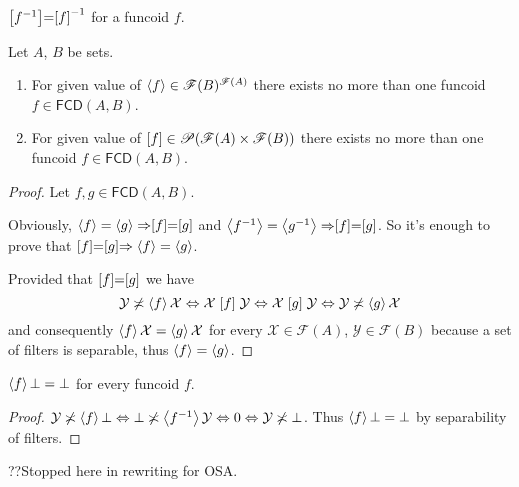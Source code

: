 \begin{obvious}
$\mathrel{\left[f^{-1}\right]}=\mathrel{\left[f\right]}^{-1}$ for a funcoid $f$.\end{obvious}
\begin{thm}
Let $A$, $B$ be sets.
\begin{enumerate}
\item For given value of $\left\langle f\right\rangle\in\mathscr{F}(B)^{\mathscr{F}(A)}$
there exists no more than one funcoid $f\in\mathsf{FCD}(A,B)$.
\item For given value of $\mathord{\mathrel{\left[f\right]}}\in\mathscr{P}(\mathscr{F}(A)\times\mathscr{F}(B))$
there exists no more than one funcoid $f\in\mathsf{FCD}(A,B)$.
\end{enumerate}
\end{thm}
\begin{proof}
Let $f,g\in\mathsf{FCD}(A,B)$.

Obviously, $\left\langle f\right\rangle=\left\langle g\right\rangle\Rightarrow\mathrel{\left[f\right]}=\mathrel{\left[g\right]}$ and
$\left\langle f^{-1}\right\rangle=\left\langle g^{-1}\right\rangle\Rightarrow\mathrel{\left[f\right]}=\mathrel{\left[g\right]}$.
So it's enough to prove that $\mathrel{\left[f\right]}=\mathrel{\left[g\right]}\Rightarrow\left\langle f\right\rangle=\left\langle g\right\rangle$.

Provided that $\mathrel{\left[f\right]}=\mathrel{\left[g\right]}$ we have \[\mathcal{Y}\not\asymp\left\langle f\right\rangle\mathcal{X}\Leftrightarrow\mathcal{X}\mathrel{\left[f\right]}\mathcal{Y}\Leftrightarrow\mathcal{X}\mathrel{\left[g\right]}\mathcal{Y}\Leftrightarrow\mathcal{Y}\not\asymp\left\langle g\right\rangle\mathcal{X}\]
and consequently $\left\langle f\right\rangle\mathcal{X}=\left\langle g\right\rangle\mathcal{X}$ for
every $\mathcal{X}\in\mathscr{F}(A)$, $\mathcal{Y}\in\mathscr{F}(B)$
because a set of filters is separable, thus $\left\langle f\right\rangle=\left\langle g\right\rangle$.\end{proof}
\begin{prop}
$\left\langle f\right\rangle\bot=\bot$
for every funcoid $f$.\end{prop}
\begin{proof}
$\mathcal{Y}\not\asymp\left\langle f\right\rangle\bot\Leftrightarrow\bot\not\asymp\left\langle f^{-1}\right\rangle\mathcal{Y}\Leftrightarrow0\Leftrightarrow\mathcal{Y}
\not\asymp\bot$.
Thus $\left\langle f\right\rangle\bot=\bot$
by separability of filters.\end{proof}

??Stopped here in rewriting for OSA.

